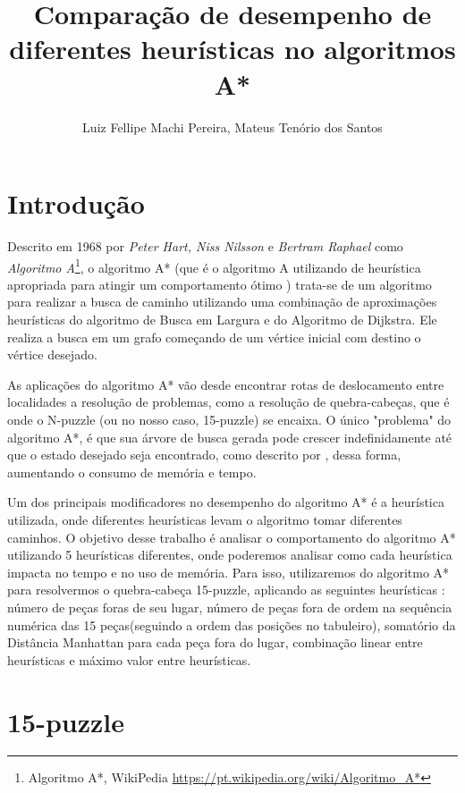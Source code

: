 \documentclass[12pt]{article}
\title{Comparação de desempenho de diferentes heurísticas no algoritmos A*}
\author{Luiz Fellipe Machi Pereira\inst{1}, Mateus Tenório dos Santos\inst{1}}
\begin{document}
 

\maketitle

\section{Introdução}

Descrito em 1968 por \textit{Peter Hart, Niss Nilsson} e \textit{Bertram Raphael} como \textit{Algoritmo A}\footnote{Algoritmo A*, WikiPedia \url{https://pt.wikipedia.org/wiki/Algoritmo_A*}}, o algoritmo A* (que é o algoritmo A utilizando de heurística apropriada para atingir um comportamento ótimo ) trata-se de um algoritmo para realizar a busca de caminho utilizando uma combinação de aproximações heurísticas do algoritmo de Busca em Largura e do Algoritmo de Dijkstra. Ele realiza a busca em um grafo começando de um vértice inicial com destino o vértice desejado. 

As aplicações do algoritmo A* vão desde encontrar rotas de deslocamento entre localidades a resolução de problemas, como a resolução de quebra-cabeças, que é onde o N-puzzle (ou no nosso caso, 15-puzzle) se encaixa. O único "problema" do algoritmo A*, é que sua árvore de busca gerada pode crescer indefinidamente até que o estado desejado seja encontrado, como descrito por \cite{Culberson94efficientlysearching}, dessa forma, aumentando o consumo de memória e tempo.

Um dos principais modificadores no desempenho do algoritmo A* é a heurística utilizada, onde diferentes heurísticas levam o algoritmo tomar diferentes caminhos. O objetivo desse trabalho é analisar o comportamento do algoritmo A* utilizando 5 heurísticas diferentes, onde poderemos analisar como cada heurística impacta no tempo e no uso de memória. Para isso, utilizaremos do algoritmo A* para resolvermos o quebra-cabeça 15-puzzle, aplicando as seguintes heurísticas : número de peças foras de seu lugar, número de peças fora de ordem na sequência numérica das 15 peças(seguindo a
ordem das posições no tabuleiro), somatório da Distância Manhattan para cada peça fora do lugar, combinação linear entre heurísticas e máximo valor entre heurísticas.

\section{15-puzzle}
\end{document}
